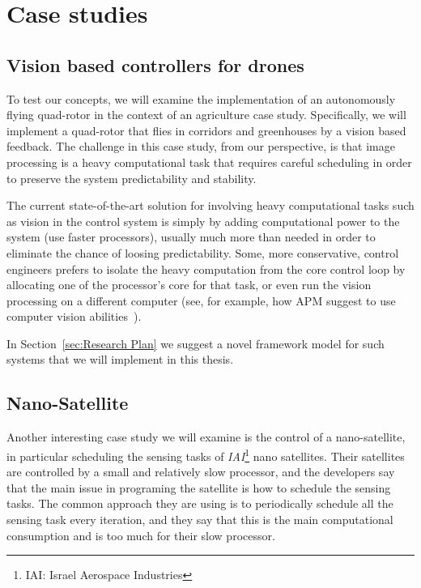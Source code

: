 \documentclass[11pt]{article}
\begin{document}


\section{Case studies}
\label{sec:Case study}

\subsection{Vision based controllers for drones}
To test our concepts, we will examine the implementation of an autonomously flying quad-rotor in the context of an agriculture case study. Specifically, we will implement a quad-rotor that flies in corridors and greenhouses by a vision based feedback. The challenge in this case study, from our perspective, is that image processing is a heavy computational task that requires careful scheduling in order to preserve the system predictability and stability.

The current state-of-the-art solution for involving heavy computational tasks such as vision in the control system is simply by adding computational power to the system (use faster processors), usually much more than needed in order to eliminate the chance of loosing predictability.
Some, more conservative, control engineers prefers to isolate the heavy computation from the core control loop by allocating one of the processor's core for that task, or even run the vision processing on a different computer (see, for example, how APM suggest to use computer vision abilities~\cite{APM}).

In Section~\ref{sec:Research Plan} we suggest a novel framework model for such systems that we will implement in this thesis.

\subsection{Nano-Satellite}
Another interesting case study we will examine is the control of a nano-satellite, in particular scheduling the sensing tasks of \textit{IAI}\footnote{IAI: Israel Aerospace Industries} nano satellites. Their satellites are controlled by a small and relatively slow processor, and the developers say that the main issue in programing the satellite is how to schedule the sensing tasks.
The common approach they are using is to periodically schedule all the sensing task every iteration, and they say that this is the main computational consumption and is too much for their slow processor.
\end{document}
